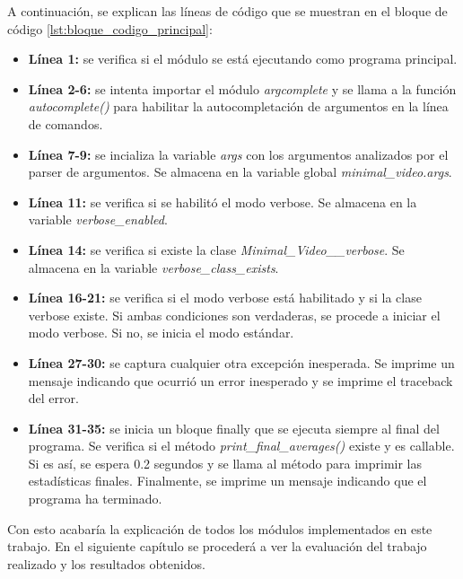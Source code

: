 A continuación, se explican las líneas de código que se muestran en el bloque de código \ref{lst:bloque_codigo_principal}:
\begin{itemize}
    \item \textbf{Línea 1:} se verifica si el módulo se está ejecutando como programa principal.
    \item \textbf{Línea 2-6:} se intenta importar el módulo \textit{argcomplete} y se llama a la función \textit{autocomplete()} para habilitar la autocompletación de argumentos en la línea de comandos.
    \item \textbf{Línea 7-9:} se incializa la variable \textit{args} con los argumentos analizados por el parser de argumentos. Se almacena en la variable global \textit{minimal\_video.args}.
    \item \textbf{Línea 11:} se verifica si se habilitó el modo verbose. Se almacena en la variable \textit{verbose\_enabled}.
    \item \textbf{Línea 14:} se verifica si existe la clase \textit{Minimal\_Video\_\_verbose}. Se almacena en la variable \textit{verbose\_class\_exists}.
    \item \textbf{Línea 16-21:} se verifica si el modo verbose está habilitado y si la clase verbose existe. Si ambas condiciones son verdaderas, se procede a iniciar el modo verbose. Si no, se inicia el modo estándar.
    \item \textbf{Línea 27-30:} se captura cualquier otra excepción inesperada. Se imprime un mensaje indicando que ocurrió un error inesperado y se imprime el traceback del error.
    \item \textbf{Línea 31-35:} se inicia un bloque finally que se ejecuta siempre al final del programa. Se verifica si el método \textit{print\_final\_averages()} existe y es callable. Si es así, se espera 0.2 segundos y se llama al método para imprimir las estadísticas finales. Finalmente, se imprime un mensaje indicando que el programa ha terminado.
\end{itemize}
\vspace{\baselineskip}

Con esto acabaría la explicación de todos los módulos implementados en este trabajo. En el siguiente capítulo se procederá a ver la evaluación del trabajo realizado y los resultados obtenidos.